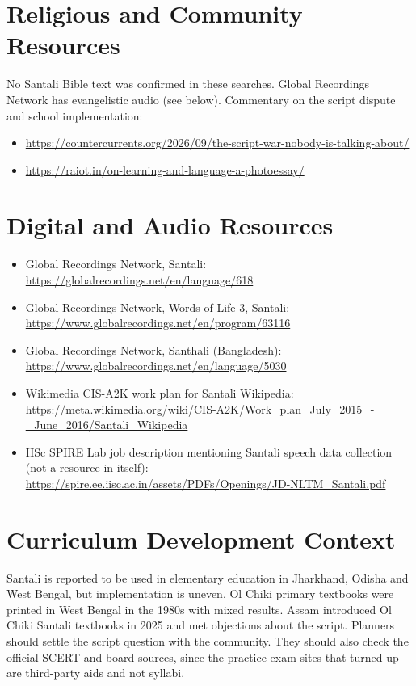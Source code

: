 \documentclass[12pt]{article}
\begin{document}
\section{Religious and Community Resources}
No Santali Bible text was confirmed in these searches. Global Recordings Network has evangelistic audio (see below). Commentary on the script dispute and school implementation:
\begin{itemize}
\item \url{https://countercurrents.org/2026/09/the-script-war-nobody-is-talking-about/}
\item \url{https://raiot.in/on-learning-and-language-a-photoessay/}
\end{itemize}

\section{Digital and Audio Resources}
\begin{itemize}
\item Global Recordings Network, Santali: \url{https://globalrecordings.net/en/language/618}
\item Global Recordings Network, Words of Life 3, Santali: \url{https://www.globalrecordings.net/en/program/63116}
\item Global Recordings Network, Santhali (Bangladesh): \url{https://www.globalrecordings.net/en/language/5030}
\item Wikimedia CIS-A2K work plan for Santali Wikipedia: \url{https://meta.wikimedia.org/wiki/CIS-A2K/Work_plan_July_2015_-_June_2016/Santali_Wikipedia}
\item IISc SPIRE Lab job description mentioning Santali speech data collection (not a resource in itself): \url{https://spire.ee.iisc.ac.in/assets/PDFs/Openings/JD-NLTM_Santali.pdf}
\end{itemize}

\section{Curriculum Development Context}
Santali is reported to be used in elementary education in Jharkhand, Odisha and West Bengal, but implementation is uneven. Ol Chiki primary textbooks were printed in West Bengal in the 1980s with mixed results. Assam introduced Ol Chiki Santali textbooks in 2025 and met objections about the script. Planners should settle the script question with the community. They should also check the official SCERT and board sources, since the practice-exam sites that turned up are third-party aids and not syllabi.
\end{document}
